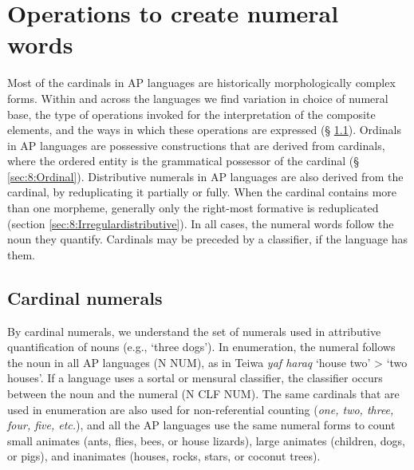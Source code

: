 \section{Operations to create numeral words} 
\label{sec:8:Operations}

Most of the cardinals in AP languages are historically morphologically complex forms. Within and across the languages we find variation in choice of numeral base, the type of operations invoked for the interpretation of the composite elements, and the ways in which these operations are expressed ({\S} \ref{sec:8:Cardinal}). Ordinals in AP languages are possessive constructions that are derived from cardinals, where the ordered entity is the grammatical possessor of the cardinal ({\S} \ref{sec:8:Ordinal}). Distributive numerals in AP languages are also derived from the cardinal, by reduplicating it partially or fully. When the cardinal contains more than one morpheme, generally only the right-most formative is reduplicated (section \ref{sec:8:Irregulardistributive}).  In all cases, the numeral words follow the noun they quantify. Cardinals may be preceded by a classifier, if the language has them. 

\subsection{Cardinal numerals}
\label{sec:8:Cardinal}
By cardinal numerals, we understand the set of numerals used in attributive quantification of nouns (e.g., `three dogs'). In enumeration, the numeral follows the noun in all AP languages (N NUM), as in Teiwa \textit{yaf haraq} `house two' {\textgreater} `two houses'. If a language uses a sortal or mensural classifier, the classifier occurs between the noun and the numeral (N CLF NUM). The same cardinals that are used in enumeration are also used for non-referential counting (\textit{one, two, three, four, five, etc.}), and all the AP languages use the same numeral forms to count small animates (ants, flies, bees, or house lizards), large animates (children, dogs, or pigs), and inanimates (houses, rocks, stars, or coconut trees).


